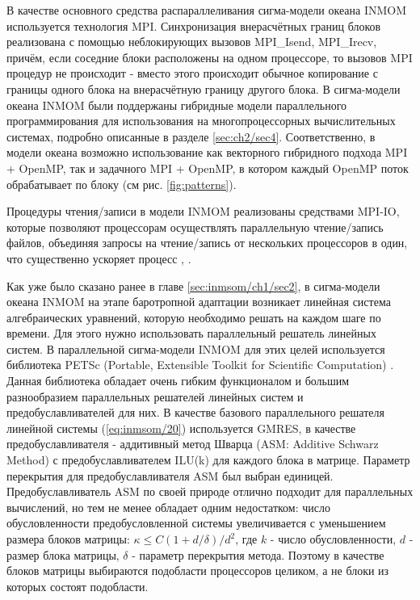     В качестве основного средства распараллеливания сигма-модели океана INMOM используется технология MPI.
    Синхронизация внерасчётных границ блоков реализована с помощью неблокирующих вызовов MPI\_Isend, MPI\_Irecv,
    причём, если соседние блоки расположены на одном процессоре, то вызовов MPI процедур не происходит - вместо этого
    происходит обычное копирование с границы одного блока на внерасчётную границу другого блока. 
     В сигма-модели океана INMOM были поддержаны гибридные модели параллельного программирования для использования на многопроцессорных вычислительных системах, подробно описанные в разделе \ref{sec:ch2/sec4}.
	Соответственно, в модели океана возможно использование как векторного гибридного подхода MPI + OpenMP, так и задачного MPI + OpenMP, в котором каждый OpenMP поток обрабатывает по блоку (см рис. \ref{fig:patterns}).
    
   	Процедуры чтения/записи в модели INMOM реализованы средствами MPI-IO,
    которые позволяют процессорам осуществлять параллельную чтение/запись файлов,
    объединяя запросы на чтение/запись от нескольких процессоров в один,
    что существенно ускоряет процесс \cite{ChaplyginINMOM2017}, \cite{TerehovINMOM2010}.
    
    Как уже было сказано ранее в главе \ref{sec:inmsom/ch1/sec2}, в сигма-модели океана INMOM на этапе баротропной адаптации возникает линейная система алгебраических уравнений, которую необходимо решать на каждом шаге по времени. Для этого нужно использовать параллельный решатель линейных систем. 
    В параллельной сигма-модели INMOM для этих целей используется библиотека PETSc (Portable, Extensible Toolkit for
Scientific Computation) \cite{PETSc}.
    Данная библиотека обладает очень гибким функционалом и большим разнообразием
    параллельных решателей линейных систем и предобуславливателей для них.
    В качестве базового параллельного решателя линейной системы (\ref{eq:inmsom/20}) 
    используется GMRES,  в качестве предобуславливателя - аддитивный метод Шварца (ASM: Additive Schwarz Method) с предобуславливателем ILU(k) для каждого блока в матрице.
    Параметр перекрытия для предобуславливателя ASM был выбран единицей.
    Предобуславливатель ASM по своей природе отлично подходит для параллельных вычислений,
    но тем не менее обладает одним
    недостатком: число обусловленности предобусловленной системы увеличивается с уменьшением размера блоков матрицы: $\kappa \leq C(1 + d/\delta)/d^2$, где $k$ - число обусловленности, $d$ - размер блока матрицы, $\delta$ - параметр перекрытия метода. %
     Поэтому в качестве блоков матрицы выбираются подобласти процессоров целиком, а не блоки из которых состоят подобласти.
    
